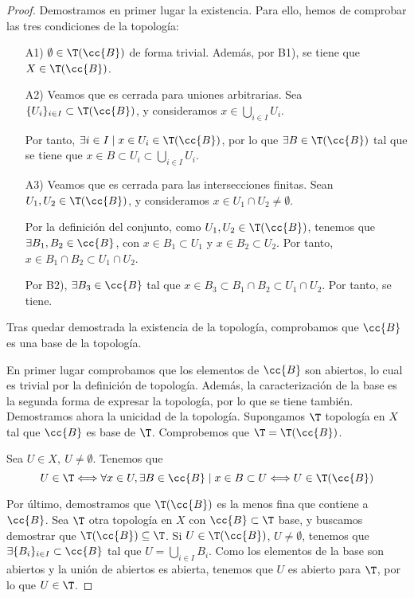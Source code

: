 \begin{proof}
    Demostramos en primer lugar la existencia. Para ello, hemos de comprobar las tres condiciones de la topología:
    \begin{enumerate}
        \item[A1)] $\emptyset\in \T(\cc{B})$ de forma trivial. Además, por B1), se tiene que $X\in \T(\cc{B})$.

        \item[A2)] Veamos que es cerrada para uniones arbitrarias. Sea $\{U_i\}_{i\in I}\subset \T(\cc{B})$, y consideramos $x\in \bigcup\limits_{i\in I}U_i$.
        
        Por tanto, $\exists i\in I\mid x\in U_i\in \T(\cc{B})$, por lo que $\exists B\in \T(\cc{B})$ tal que se tiene que $x\in B\subset U_i\subset \bigcup\limits_{i\in I}U_i$.

        \item[A3)] Veamos que es cerrada para las intersecciones finitas. Sean $U_1,U_2\in \T(\cc{B})$, y consideramos $x\in U_1\cap U_2\neq \emptyset$.

        Por la definición del conjunto, como $U_1,U_2\in \T(\cc{B})$, tenemos que $\exists B_1,B_2\in \cc{B}$, con $x\in B_1\subset U_1$ y $x\in B_2\subset U_2$. Por tanto, $x\in B_1\cap B_2\subset U_1\cap U_2$.

        Por B2), $\exists B_3\in \cc{B}$ tal que $x\in B_3\subset B_1\cap B_2\subset U_1\cap U_2$. Por tanto, se tiene.
    \end{enumerate}

    Tras quedar demostrada la existencia de la topología, comprobamos que $\cc{B}$ es una base de la topología.
    
    En primer lugar comprobamos que los elementos de $\cc{B}$ son abiertos, lo cual es trivial por la definición de topología. Además, la caracterización de la base es la segunda forma de expresar la topología, por lo que se tiene también.\\

    Demostramos ahora la unicidad de la topología. Supongamos $\T$ topología en $X$ tal que $\cc{B}$ es base de $\T$. Comprobemos que $\T=\T(\cc{B})$.

    Sea $U\in X,~U\neq \emptyset$. Tenemos que
    \begin{equation*}
        U\in \T\Longleftrightarrow \forall x\in U, \exists B\in \cc{B}\mid x\in B\subset U
        \Longleftrightarrow U\in \T(\cc{B})
    \end{equation*}

    Por último, demostramos que $\T(\cc{B})$ es la menos fina que contiene a $\cc{B}$. Sea $\T$ otra topología en $X$ con $\cc{B}\subset \T$ base, y buscamos demostrar que $\T(\cc{B})\subseteq \T$. Si $U\in \T(\cc{B})$, $U\neq \emptyset$, tenemos que $\exists \{B_i\}_{i\in I}\subset \cc{B}$ tal que $U=\bigcup\limits_{i\in I} B_i$. Como los elementos de la base son abiertos y la unión de abiertos es abierta, tenemos que $U$ es abierto para $\T$, por lo que $U\in \T$.
\end{proof}

